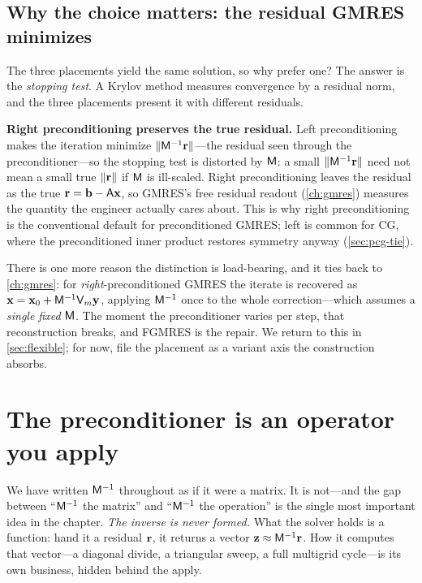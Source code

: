 \subsection{Why the choice matters: the residual GMRES minimizes}

The three placements yield the same solution, so why prefer one? The answer is the
\emph{stopping test}. A Krylov method measures convergence by a residual norm, and the
three placements present it with different residuals.

\begin{keyidea}
\textbf{Right preconditioning preserves the true residual.} Left preconditioning makes
the iteration minimize $\lVert\mathsf{M}^{-1}\mathbf{r}\rVert$---the residual seen through the
preconditioner---so the stopping test is distorted by $\mathsf{M}$: a small
$\lVert\mathsf{M}^{-1}\mathbf{r}\rVert$ need not mean a small true $\lVert\mathbf{r}\rVert$ if $\mathsf{M}$ is
ill-scaled. Right preconditioning leaves the residual as the true $\mathbf{r}=\mathbf{b}-\mathsf{A}\mathbf{x}$, so
GMRES's free residual readout (\cref{ch:gmres}) measures the quantity the engineer
actually cares about. This is why right preconditioning is the conventional default for
preconditioned GMRES; left is common for CG, where the preconditioned inner product
restores symmetry anyway (\cref{sec:pcg-tie}).
\end{keyidea}

There is one more reason the distinction is load-bearing, and it ties back to
\cref{ch:gmres}: for \emph{right}-preconditioned GMRES the iterate is recovered as
$\mathbf{x}=\mathbf{x}_0+\mathsf{M}^{-1}\mathsf{V}_m\mathbf{y}$, applying $\mathsf{M}^{-1}$ once to the whole
correction---which assumes a \emph{single fixed} $\mathsf{M}$. The moment the preconditioner
varies per step, that reconstruction breaks, and FGMRES is the repair. We return to this
in \cref{sec:flexible}; for now, file the placement as a variant axis the construction
absorbs.

\section{The preconditioner is an operator you apply}
\label{sec:operator}

We have written $\mathsf{M}^{-1}$ throughout as if it were a matrix. It is not---and the gap
between ``$\mathsf{M}^{-1}$ the matrix'' and ``$\mathsf{M}^{-1}$ the operation'' is the single
most important idea in the chapter. \emph{The inverse is never formed.} What the solver
holds is a function: hand it a residual $\mathbf{r}$, it returns a vector $\mathbf{z}\approx\mathsf{M}^{-1}\mathbf{r}$.
How it computes that vector---a diagonal divide, a triangular sweep, a full multigrid
cycle---is its own business, hidden behind the apply.

